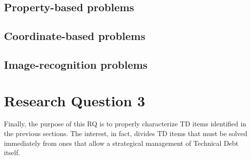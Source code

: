
\subsection{Property-based problems}

\subsection{Coordinate-based problems}

\subsection{Image-recognition problems}


\section{Research Question 3}

Finally, the purpose of this RQ is to properly characterize TD items identified in the previous sections. The interest, in fact, divides TD items that must be solved immediately from ones that allow a strategical management of Technical Debt itself. 

